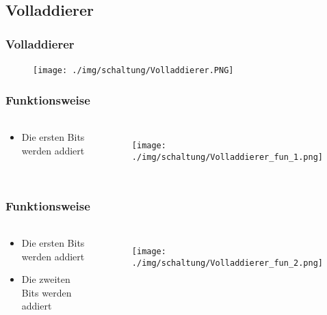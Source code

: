 \subsection{Volladdierer} %
\label{sub:Volladdierer}
\begin{frame}
    \frametitle{Volladdierer}
    \framesubtitle{}
    \begin{figure}[H]
    \begin{center}
            \texttt{[image: ./img/schaltung/Volladdierer.PNG]}
    \end{center}
    \end{figure}
\end{frame}
\begin{frame}
    \frametitle{Funktionsweise}
    \framesubtitle{}
     \begin{columns}[c]
            \begin{block}{}
                \begin{itemize}
                    \item Die ersten Bits werden addiert
                \end{itemize}
            \end{block}
            \begin{figure}[H]
            \begin{center}
                    \texttt{[image: ./img/schaltung/Volladdierer\_fun\_1.png]}
            \end{center}
            \end{figure}
     \end{columns}
\end{frame}
\begin{frame}
    \frametitle{Funktionsweise}
    \framesubtitle{}
     \begin{columns}[c]
            \begin{block}{}
                \begin{itemize}
                    \item Die ersten Bits werden addiert
                    \item Die zweiten Bits werden addiert
                \end{itemize}
            \end{block}
            \begin{figure}[H]
            \begin{center}
                    \texttt{[image: ./img/schaltung/Volladdierer\_fun\_2.png]}
            \end{center}
            \end{figure}
     \end{columns}
\end{frame}
